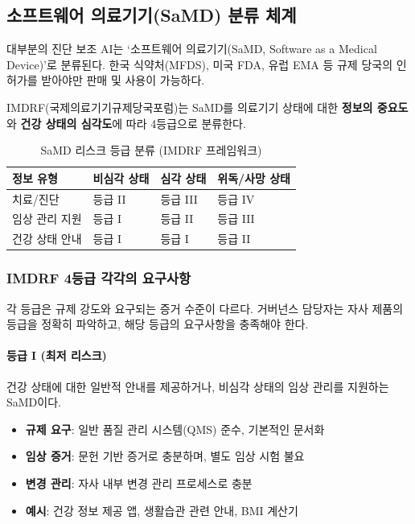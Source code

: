 \subsection{소프트웨어 의료기기(SaMD) 분류 체계}
\label{sec:16.1.1}

대부분의 진단 보조 AI는 `소프트웨어 의료기기(SaMD, Software as a Medical Device)'로 분류된다. 한국 식약처(MFDS), 미국 FDA, 유럽 EMA 등 규제 당국의 인허가를 받아야만 판매 및 사용이 가능하다.

IMDRF(국제의료기기규제당국포럼)는 SaMD를 의료기기 상태에 대한 \textbf{정보의 중요도}와 \textbf{건강 상태의 심각도}에 따라 4등급으로 분류한다.

\begin{table}[htbp]
\centering
\caption{SaMD 리스크 등급 분류 (IMDRF 프레임워크)}
\label{tab:16_samd}
\begin{tabularx}{\textwidth}{p{2.5cm}p{3cm}p{3cm}X}
\toprule
\textbf{정보 유형} & \textbf{비심각 상태} & \textbf{심각 상태} & \textbf{위독/사망 상태} \\
\midrule
치료/진단 & 등급 II & 등급 III & 등급 IV \\
임상 관리 지원 & 등급 I & 등급 II & 등급 III \\
건강 상태 안내 & 등급 I & 등급 I & 등급 II \\
\bottomrule
\end{tabularx}
\end{table}

\subsubsection{IMDRF 4등급 각각의 요구사항}

각 등급은 규제 강도와 요구되는 증거 수준이 다르다. 거버넌스 담당자는 자사 제품의 등급을 정확히 파악하고, 해당 등급의 요구사항을 충족해야 한다.

\paragraph{등급 I (최저 리스크)}
건강 상태에 대한 일반적 안내를 제공하거나, 비심각 상태의 임상 관리를 지원하는 SaMD이다.

\begin{itemize}
 \item \textbf{규제 요구}: 일반 품질 관리 시스템(QMS) 준수, 기본적인 문서화
 \item \textbf{임상 증거}: 문헌 기반 증거로 충분하며, 별도 임상 시험 불요
 \item \textbf{변경 관리}: 자사 내부 변경 관리 프로세스로 충분
 \item \textbf{예시}: 건강 정보 제공 앱, 생활습관 관련 안내, BMI 계산기
\end{itemize}


